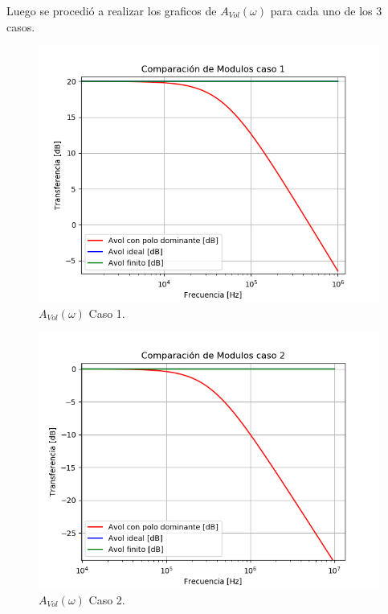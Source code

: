 Luego se procedió a realizar los graficos de $A_{Vol}(\omega)$ para cada uno de los 3 casos.
\begin{figure}[H]	
	\centering
	\includegraphics[width=\textwidth]{Ejercicio1/Imagenes/HCompC1.png}
	\caption{$A_{Vol}(\omega)$ Caso 1.}
	\label{fig:AvolC1}
\end{figure}
\begin{figure}[H]	
	\centering
	\includegraphics[width=\textwidth]{Ejercicio1/Imagenes/HCompC2.png}
	\caption{$A_{Vol}(\omega)$ Caso 2.}
	\label{fig:AvolC2}
\end{figure}
